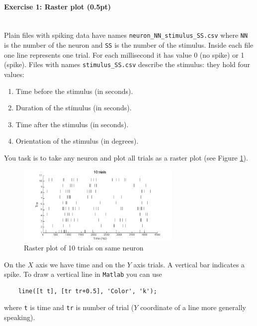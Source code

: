 \documentclass[a4paper,11pt]{article}
\newenvironment{exercise}[3]{\paragraph{Exercise #1: #2 (#3pt)}\ \\}{
\medskip}
\begin{document}
\begin{exercise}{1}{Raster plot}{0.5}
Plain files with spiking data have names \texttt{neuron\_NN\_stimulus\_SS.csv} where \texttt{NN} is the number of the neuron and \texttt{SS} is the number of the stimulus. Inside each file one line represents one trial. For each millisecond it has value 0 (no spike) or 1 (spike). Files with names \texttt{stimulus\_SS.csv} describe the stimulus: they hold four values:
\begin{enumerate}
\itemsep 0em
	\item Time before the stimulus (in seconds).
	\item Duration of the stimulus (in seconds).
	\item Time after the stimulus (in seconds).
	\item Orientation of the stimulus (in degrees).
\end{enumerate}
\end{exercise}
You task is to take any neuron and plot all trials as a raster plot (see Figure \ref{fig:raster_plot}).
\begin{figure}[H]
   \centering
   \includegraphics[width=0.7\textwidth]{raster10tr.png} 
   \caption{Raster plot of 10 trials on same neuron}
   \label{fig:raster_plot}
\end{figure}
On the $X$ axis we have time and on the $Y$ axis trials. A vertical bar indicates a spike. To draw a vertical line in \texttt{Matlab} you can use
\begin{verbatim}
	line([t t], [tr tr+0.5], 'Color', 'k');
\end{verbatim}
where \texttt{t} is time and \texttt{tr} is number of trial ($Y$ coordinate of a line more generally speaking).
\end{document}

